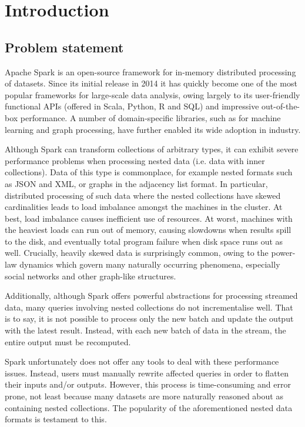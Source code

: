 \chapter{Introduction}

\section{Problem statement} {

Apache Spark \cite{spark} is an open-source framework for in-memory distributed processing of datasets. Since its initial release in 2014 it has quickly become one of the most popular frameworks for large-scale data analysis, owing largely to its user-friendly functional APIs (offered in Scala, Python, R and SQL) and impressive out-of-the-box performance. A number of domain-specific libraries, such as for machine learning and graph processing, have further enabled its wide adoption in industry.

Although Spark can transform collections of arbitrary types, it can exhibit severe performance problems when processing nested data (i.e. data with inner collections). Data of this type is commonplace, for example nested formats such as JSON and XML, or graphs in the adjacency list format. In particular, distributed processing of such data where the nested collections have skewed cardinalities leads to load imbalance amongst the machines in the cluster. At best, load imbalance causes inefficient use of resources. At worst, machines with the heaviest loads can run out of memory, causing slowdowns when results spill to the disk, and eventually total program failure when disk space runs out as well. Crucially, heavily skewed data is surprisingly common, owing to the power-law dynamics which govern many naturally occurring phenomena, especially social networks and other graph-like structures.

Additionally, although Spark offers powerful abstractions for processing streamed data, many queries involving nested collections do not incrementalise well. That is to say, it is not possible to process only the new batch and update the output with the latest result. Instead, with each new batch of data in the stream, the entire output must be recomputed.

Spark unfortunately does not offer any tools to deal with these performance issues. Instead, users must manually rewrite affected queries in order to flatten their inputs and/or outputs. However, this process is time-consuming and error prone, not least because many datasets are more naturally reasoned about as containing nested collections. The popularity of the aforementioned nested data formats is testament to this.

}

